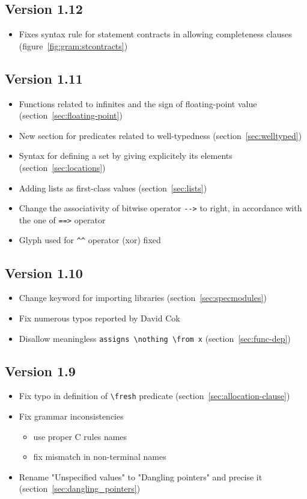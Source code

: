 \subsection{Version 1.12} %
\begin{itemize}
\item Fixes syntax rule for statement contracts in allowing completeness clauses
  (figure~\ref{fig:gram:stcontracts})
\end{itemize}

\subsection{Version 1.11}
\begin{itemize}
\item Functions related to infinites and the sign of floating-point value
  (section~\ref{sec:floating-point})
\item New section for predicates related to well-typedness
  (section~\ref{sec:welltyped})
\item Syntax for defining a set by giving explicitely its elements
  (section~\ref{sec:locations})
\item Adding lists as first-class values (section~\ref{sec:lists})
\item Change the associativity of bitwise operator \lstinline|-->| to right,
  in accordance with the one of \lstinline|==>| operator
\item Glyph used for \lstinline|^^| operator (xor) fixed
\end{itemize}

\subsection{Version 1.10}
\begin{itemize}
\item Change keyword for importing libraries (section~\ref{sec:specmodules})
\item Fix numerous typos reported by David Cok
\item Disallow meaningless \lstinline|assigns \nothing \from x|
  (section~\ref{sec:func-dep})
\end{itemize}

\subsection{Version 1.9}
\begin{itemize}
\item Fix typo in definition of \lstinline|\fresh| predicate
  (section~\ref{sec:allocation-clause})
\item Fix grammar inconsistencies
  \begin{itemize}
  \item use proper C rules names
  \item fix mismatch in non-terminal names
  \end{itemize}
\item Rename "Unspecified values" to "Dangling pointers" and precise it
  (section~\ref{sec:dangling_pointers})
\end{itemize}

